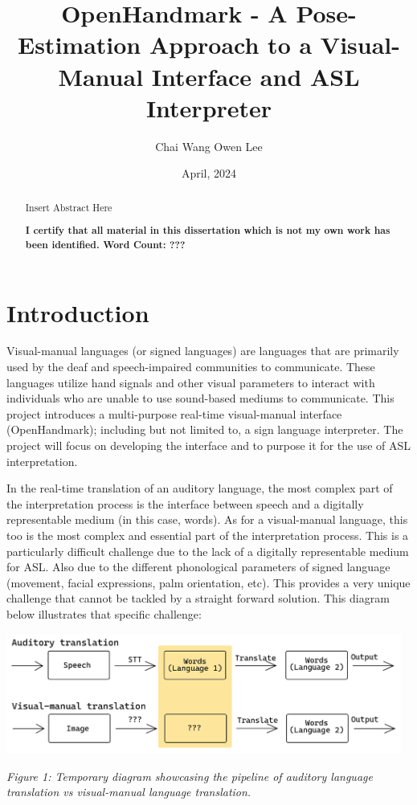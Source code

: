 \documentclass[11pt]{article}
\begin{document}
\title{OpenHandmark - A Pose-Estimation Approach to a Visual-Manual Interface and ASL Interpreter}
\author{Chai Wang Owen Lee}

\date{April, 2024}
\maketitle

\begin{abstract}
    Insert Abstract Here
    \vspace*{\fill}

    \noindent 
    \textbf{I certify that all material in this dissertation which is not my own work has been identified. Word Count: ???}
\end{abstract}

\pagebreak
{}
\begingroup
  \flushbottom
  \setlength{\parskip}{0pt plus 1fil}%
  \tableofcontents
  \newpage
\endgroup

\pagebreak
\section{Introduction}
    Visual-manual languages (or signed languages) are languages that are primarily used by the deaf and speech-impaired communities to communicate. These languages utilize hand signals and other visual parameters to interact with individuals who are unable to use sound-based mediums to communicate. This project introduces a multi-purpose real-time visual-manual interface (OpenHandmark); including but not limited to, a sign language interpreter. The project will focus on developing the interface and to purpose it for the use of ASL interpretation.
    
    In the real-time translation of an auditory language, the most complex part of the interpretation process is the interface between speech and a digitally representable medium (in this case, words). As for a visual-manual language, this too is the most complex and essential part of the interpretation process. This is a particularly difficult challenge due to the lack of a digitally representable medium for ASL. Also due to the different phonological parameters of signed language (movement, facial expressions, palm orientation, etc). This provides a very unique challenge that cannot be tackled by a straight forward solution. This diagram below illustrates that specific challenge:

    \begin{center}
        \includegraphics[width=13cm]{audVsVM.png}
        \\
        \raggedright \textit{
        Figure 1: Temporary diagram showcasing the pipeline of auditory language translation vs visual-manual language translation.
        }
    \end{center}
\end{document}
